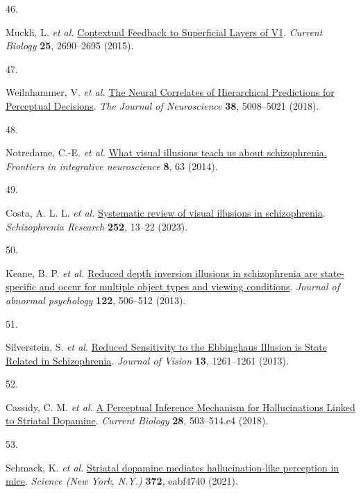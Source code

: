 \documentclass[
]{article}
\newlength{\cslhangindent}
\newlength{\csllabelwidth}
\newenvironment{CSLReferences}[2] %
 {\begin{list}{}{%
  \setlength{\itemindent}{0pt}
  \setlength{\leftmargin}{0pt}
  \setlength{\parsep}{0pt}
  \ifodd #1
   \setlength{\leftmargin}{\cslhangindent}
   \setlength{\itemindent}{-1\cslhangindent}
  \fi
  \setlength{\itemsep}{#2\baselineskip}}}
 {\end{list}}
\newcommand{\CSLLeftMargin}[1]{\parbox[t]{\csllabelwidth}{\strut#1\strut}}
\newcommand{\CSLRightInline}[1]{\parbox[t]{\linewidth - \csllabelwidth}{\strut#1\strut}}
\begin{document}
\begin{CSLReferences}{0}{0}
\CSLLeftMargin{46. }%
\CSLRightInline{Muckli, L. \emph{et al.}
\href{https://doi.org/10.1016/j.cub.2015.08.057}{Contextual {Feedback}
to {Superficial} {Layers} of {V1}}. \emph{Current Biology} \textbf{25},
2690--2695 (2015).}

\CSLLeftMargin{47. }%
\CSLRightInline{Weilnhammer, V. \emph{et al.}
\href{https://doi.org/10.1523/JNEUROSCI.2901-17.2018}{The {Neural}
{Correlates} of {Hierarchical} {Predictions} for {Perceptual}
{Decisions}}. \emph{The Journal of Neuroscience} \textbf{38}, 5008--5021
(2018).}

\CSLLeftMargin{48. }%
\CSLRightInline{Notredame, C.-E. \emph{et al.}
\href{https://doi.org/10.3389/fnint.2014.00063}{What visual illusions
teach us about schizophrenia.} \emph{Frontiers in integrative
neuroscience} \textbf{8}, 63 (2014).}

\CSLLeftMargin{49. }%
\CSLRightInline{Costa, A. L. L. \emph{et al.}
\href{https://doi.org/10.1016/j.schres.2022.12.030}{Systematic review of
visual illusions in schizophrenia}. \emph{Schizophrenia Research}
\textbf{252}, 13--22 (2023).}

\CSLLeftMargin{50. }%
\CSLRightInline{Keane, B. P. \emph{et al.}
\href{https://doi.org/10.1037/a0032110}{Reduced depth inversion
illusions in schizophrenia are state-specific and occur for multiple
object types and viewing conditions}. \emph{Journal of abnormal
psychology} \textbf{122}, 506--512 (2013).}

\CSLLeftMargin{51. }%
\CSLRightInline{Silverstein, S. \emph{et al.}
\href{https://doi.org/10.1167/13.9.1261}{Reduced {Sensitivity} to the
{Ebbinghaus} {Illusion} is {State} {Related} in {Schizophrenia}}.
\emph{Journal of Vision} \textbf{13}, 1261--1261 (2013).}

\CSLLeftMargin{52. }%
\CSLRightInline{Cassidy, C. M. \emph{et al.}
\href{https://doi.org/10.1016/j.cub.2017.12.059}{A {Perceptual}
{Inference} {Mechanism} for {Hallucinations} {Linked} to {Striatal}
{Dopamine}}. \emph{Current Biology} \textbf{28}, 503--514.e4 (2018).}

\CSLLeftMargin{53. }%
\CSLRightInline{Schmack, K. \emph{et al.}
\href{https://doi.org/10.1126/science.abf4740}{Striatal dopamine
mediates hallucination-like perception in mice}. \emph{Science (New
York, N.Y.)} \textbf{372}, eabf4740 (2021).}


\end{CSLReferences}
\end{document}
